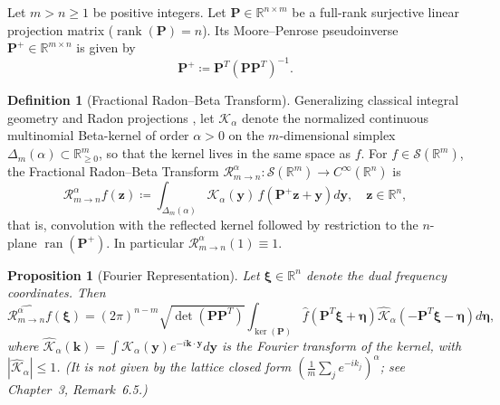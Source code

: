 \documentclass[11pt,a4paper]{article}
\theoremstyle{plain}
\newtheorem{proposition}[theorem]{Proposition}
\theoremstyle{definition}
\newtheorem{definition}[theorem]{Definition}
\theoremstyle{remark}
\numberwithin{equation}{section}
\providecommand{\xref}[2]{#2}
\begin{document}
Let $m > n \ge 1$ be positive integers. Let $\mathbf{P} \in \mathbb{R}^{n \times m}$ be a full-rank surjective linear projection matrix ($\operatorname{rank}(\mathbf{P}) = n$). Its Moore--Penrose pseudoinverse $\mathbf{P}^+ \in \mathbb{R}^{m \times n}$ is given by
\begin{equation}
\mathbf{P}^+ \coloneqq \mathbf{P}^T (\mathbf{P} \mathbf{P}^T)^{-1}.
\end{equation}

\begin{definition}[Fractional Radon--Beta Transform]
\label{def:radon_beta}
Generalizing classical integral geometry and Radon projections \cite{helgason2011}, let $\mathcal{K}_\alpha$ denote the normalized continuous multinomial Beta-kernel of order $\alpha > 0$ on the $m$-dimensional simplex $\Delta_m(\alpha) \subset \mathbb{R}^m_{\ge 0}$, so that the kernel lives in the same space as $f$. For $f \in \mathcal{S}(\mathbb{R}^m)$, the Fractional Radon--Beta Transform $\mathcal{R}_{m \to n}^\alpha : \mathcal{S}(\mathbb{R}^m) \to C^\infty(\mathbb{R}^n)$ is
\begin{equation}
\label{eq:radon_beta_def}
\mathcal{R}_{m \to n}^\alpha f(\mathbf{z}) \coloneqq \int_{\Delta_m(\alpha)} \mathcal{K}_\alpha(\mathbf{y})\, f\left(\mathbf{P}^+ \mathbf{z} + \mathbf{y}\right) d\mathbf{y}, \quad \mathbf{z} \in \mathbb{R}^n,
\end{equation}
that is, convolution with the reflected kernel followed by restriction to the $n$-plane $\operatorname{ran}(\mathbf{P}^+)$. In particular $\mathcal{R}_{m\to n}^\alpha(1) \equiv 1$.
\end{definition}

\begin{proposition}[Fourier Representation]
\label{prop:fourier_rep}
Let $\boldsymbol{\xi} \in \mathbb{R}^n$ denote the dual frequency coordinates. Then
\begin{equation}
\widehat{\mathcal{R}_{m \to n}^\alpha f}(\boldsymbol{\xi}) = (2\pi)^{n-m} \sqrt{\det(\mathbf{P}\mathbf{P}^T)} \int_{\operatorname{ker}(\mathbf{P})} \widehat{f}\left(\mathbf{P}^T \boldsymbol{\xi} + \boldsymbol{\eta}\right) \widehat{\mathcal{K}}_\alpha\left(-\mathbf{P}^T \boldsymbol{\xi} - \boldsymbol{\eta}\right) d\boldsymbol{\eta},
\end{equation}
where $\widehat{\mathcal{K}}_\alpha(\mathbf{k}) = \int \mathcal{K}_\alpha(\mathbf{y}) e^{-i\mathbf{k}\cdot\mathbf{y}}d\mathbf{y}$ is the Fourier transform of the kernel, with $|\widehat{\mathcal{K}}_\alpha| \le 1$. (It is not given by the lattice closed form $(\frac{1}{m}\sum_j e^{-ik_j})^\alpha$; see Chapter~3, Remark~\xref{chap03:rem:no_semigroup}{6.5}.)
\end{proposition}
\end{document}
